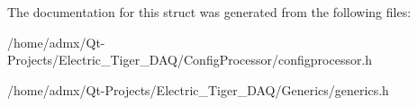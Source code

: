 The documentation for this struct was generated from the following files\+:\begin{DoxyCompactItemize}
\item 
/home/admx/\+Qt-\/\+Projects/\+Electric\+\_\+\+Tiger\+\_\+\+D\+A\+Q/\+Config\+Processor/configprocessor.\+h\item 
/home/admx/\+Qt-\/\+Projects/\+Electric\+\_\+\+Tiger\+\_\+\+D\+A\+Q/\+Generics/generics.\+h\end{DoxyCompactItemize}
